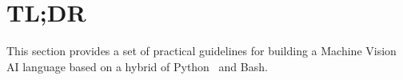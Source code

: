 \section{TL;DR}
\label{recipe}

This section provides a set of practical guidelines for building a Machine Vision AI language based on a hybrid of Python~ and Bash. 



